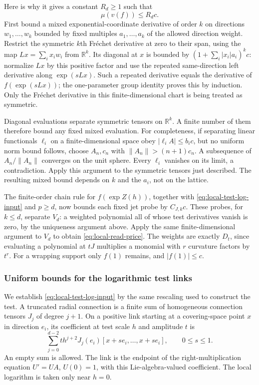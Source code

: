 Here is why it gives a constant $R_d\ge1$ such that
\begin{equation}\label{eq:local-read-price}
                         \mu(v(f))\le R_d c.
\end{equation}
First bound a mixed exponential-coordinate derivative of order $k$
on directions $w_1,\ldots,w_k$ bounded by fixed multiples
$a_1,\ldots,a_k$ of the allowed direction weight. Restrict the symmetric
$k$th Fr\'echet derivative at zero to their span, using the map
$Lx=\sum_i x_iw_i$ from $\mathbb R^k$. Its diagonal at $x$ is bounded
by $(1+\sum_i|x_i|a_i)^k c$: normalize $Lx$ by this positive factor
and use the repeated same-direction left derivative along
$\exp(sLx)$. Such a repeated derivative equals the derivative of
$f(\exp(sLx))$; the one-parameter group identity proves this by
induction. Only the Fr\'echet derivative in this finite-dimensional
chart is being treated as symmetric.

Diagonal evaluations separate symmetric tensors on $\mathbb R^k$.
A finite number of them therefore bound any fixed mixed evaluation.
For completeness, if separating linear functionals $\ell_i$ on a
finite-dimensional space obey $|\ell_i A|\le b_i c$, but no uniform
norm bound follows, choose $A_n,c_n$ with
$\|A_n\|>(n+1)c_n$. A subsequence of $A_n/\|A_n\|$ converges on the
unit sphere. Every $\ell_i$ vanishes on its limit, a contradiction.
Apply this argument to the symmetric tensors just described. The
resulting mixed bound depends on $k$ and the $a_i$, not on the lattice.

The finite-order chain rule for $f(\exp Z(h))$, together with
\eqref{eq:local-test-log-input} and $p\ge d$, now bounds each fixed
jet probe by $C_{J,k}c$. These probes, for $k\le d$, separate $V_d$:
a weighted polynomial all of whose test derivatives vanish is zero,
by the uniqueness argument above. Apply the same finite-dimensional
argument to $V_d$ to obtain \eqref{eq:local-read-price}. The weights
are exactly $D_t$, since evaluating a polynomial at $tJ$ multiplies
a monomial with $r$ curvature factors by $t^r$.
For a wrapping support only $f(1)$ remains, and $|f(1)|\le c$.

\subsubsection{Uniform bounds for the logarithmic test links}
We establish \eqref{eq:local-test-log-input} by the same rescaling
used to construct the test. A truncated radial connection is a finite
sum of homogeneous connection tensors $J_j$ of degree $j+1$.
On a positive link starting at a covering-space point $x$ in direction
$e_i$, its coefficient at test scale $h$ and amplitude $t$ is
\[
       \sum_{j=0}^{d-2}t h^{j+2}
                    J_j(e_i)[x+s e_i,\ldots,x+s e_i],
                  \qquad 0\le s\le1.
\]
An empty sum is allowed. The link is the endpoint of the
right-multiplication equation $U'=UA$, $U(0)=1$, with this
Lie-algebra-valued coefficient. The local logarithm is taken only
near $h=0$.


